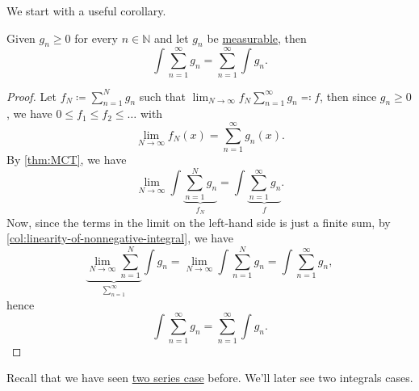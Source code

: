 We start with a useful corollary.
\begin{corollary}\label{col:Tonelli-theorem-for-nonnegative-series-and-integrals}
	Given \(g_{n}\geq 0\) for every \(n\in\mathbb{N} \) and let \(g_{n}\) be \hyperref[def:measurable-function]{measurable}, then
	\[
		\int \sum_{n=1}^{\infty} g_{n} = \sum_{n=1}^{\infty} \int g_{n}.
	\]
\end{corollary}
\begin{proof}
	Let \(f_{N} \coloneqq \sum_{n=1}^{N} g_{n}\) such that \(\lim_{N \to \infty} f_{N} \sum_{n=1}^{\infty} g_{n} \eqqcolon f\), then since \(g_{n}\geq 0\), we have \(0\leq f_{1}\leq f_{2}\leq \dots  \) with
	\[
		\lim_{N \to \infty} f_{N}(x) = \sum_{n=1}^{\infty} g_{n}(x).
	\]
	By \autoref{thm:MCT}, we have
	\[
		\lim_{N \to \infty} \int \underbrace{\sum_{n=1}^N g_{n}}_{f_{N}} = \int \underbrace{\sum_{n=1}^{\infty} g_{n }}_{f}.
	\]
	Now, since the terms in the limit on the left-hand side is just a finite sum, by \autoref{col:linearity-of-nonnegative-integral}, we have
	\[
		\underbrace{\lim_{N \to \infty} \sum_{n=1}^{N}}_{\sum_{n=1}^{\infty} } \int g_{n} =\lim_{N \to \infty} \int \sum_{n=1}^N g_{n} = \int \sum_{n=1}^{\infty} g_{n},
	\]
	hence
	\[
		\int \sum_{n=1}^{\infty} g_{n} = \sum_{n=1}^{\infty} \int g_{n}.
	\]
\end{proof}
\begin{remark}
	Recall that we have seen \hyperref[thm:Tonelli-for-series]{two series case} before. We'll later see two integrals cases.
\end{remark}

